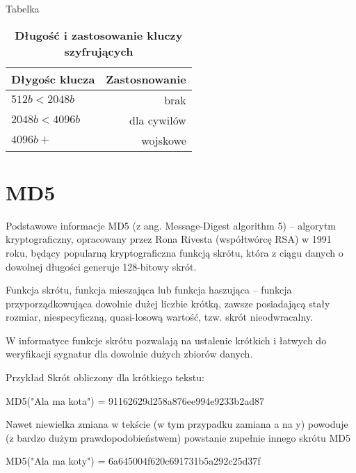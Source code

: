 \documentclass[10pt]{beamer}
\begin{document}
\begin{frame}{Tabelka}
  \begin{table}
   \caption*{\textbf{\Large Długość i zastosowanie kluczy szyfrujących}}
    \begin{tabular}{@{} lr @{}}
      \toprule
      Dłygośc klucza & Zastosnowanie\\
      \midrule
      $512b < 2048b$  & brak\\
      $2048b < 4096b$& dla cywilów\\
      $4096b+$ & wojskowe\\
      \bottomrule
    \end{tabular}
  \end{table}
\end{frame}

\section{MD5}

\begin{frame}{Podstawowe informacje}
  MD5 (z ang. Message-Digest algorithm 5) – algorytm kryptograficzny, opracowany przez Rona Rivesta (współtwórcę RSA) w 1991 roku, będący popularną kryptograficzna funkcją skrótu, która z ciągu danych o dowolnej długości generuje 128-bitowy skrót.
  
  Funkcja skrótu, funkcja mieszająca lub funkcja haszująca – funkcja przyporządkowująca dowolnie dużej liczbie krótką, zawsze posiadającą stały rozmiar, niespecyficzną, quasi-losową wartość, tzw. skrót nieodwracalny.

W informatyce funkcje skrótu pozwalają na ustalenie krótkich i łatwych do weryfikacji sygnatur dla dowolnie dużych zbiorów danych.
\end{frame}

\begin{frame}{Przykład}
  Skrót obliczony dla krótkiego tekstu:
  
	\begin{block}{MD5("Ala ma kota") = 91162629d258a876ee994e9233b2ad87}
    \end{block}
    
    Nawet niewielka zmiana w tekście (w tym przypadku zamiana a na y) powoduje (z 		bardzo dużym prawdopodobieństwem) powstanie zupełnie innego skrótu MD5
	
	\begin{block}{MD5("Ala ma koty") = 6a645004f620c691731b5a292c25d37f}
    \end{block}
\end{frame}
\end{document}
